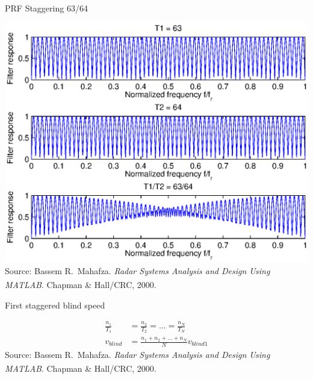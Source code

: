 \documentclass[mathserif]{beamer}
\begin{document}
   
    \begin{frame}{PRF Staggering 63/64}
      \begin{minipage}[t][0.8\textheight][t]{\textwidth}
	\includegraphics[width=\linewidth]{prfStaggering63_64} \\
	\vfill
	\tiny{Source: Bassem R.~Mahafza. \emph{Radar Systems Analysis and Design Using MATLAB\textsuperscript{\textregistered}}. Chapman \& Hall/CRC, 2000.}
      \end{minipage}
    \end{frame}
    
    \begin{frame}{First staggered blind speed}
      \begin{minipage}[t][0.8\textheight][t]{\textwidth}
	\begin{align}
	  \frac{n_1}{T_1} & = \frac{n_2}{T_2} = ... = \frac{n_N}{T_N} \nonumber \\
	  v_{blind} & = \frac{n_1 + n_2 + ... + n_N}{N} v_{blind1} \nonumber
	\end{align}
	\vfill
	\tiny{Source: Bassem R.~Mahafza. \emph{Radar Systems Analysis and Design Using MATLAB\textsuperscript{\textregistered}}. Chapman \& Hall/CRC, 2000.}
      \end{minipage}
    \end{frame}

    
    
\end{document}
